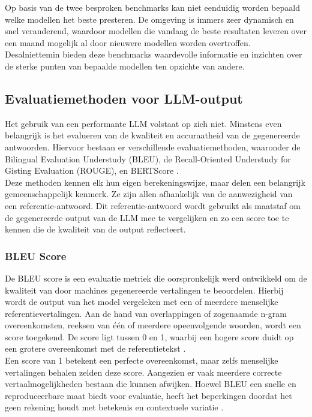 Op basis van de twee besproken benchmarks kan niet eenduidig worden bepaald welke modellen het beste presteren. De omgeving is immers zeer dynamisch en snel veranderend, waardoor modellen die vandaag de beste resultaten leveren over een maand mogelijk al door nieuwere modellen worden overtroffen. Desalniettemin bieden deze benchmarks waardevolle informatie en inzichten over de sterke punten van bepaalde modellen ten opzichte van andere.

\subsection{Evaluatiemethoden voor LLM-output}
Het gebruik van een performante LLM volstaat op zich niet. Minstens even belangrijk is het evalueren van de kwaliteit en accuraatheid van de gegenereerde antwoorden. Hiervoor bestaan er verschillende evaluatiemethoden, waaronder de Bilingual Evaluation Understudy (BLEU), de Recall-Oriented Understudy for Gisting Evaluation (ROUGE), en BERTScore \autocite{microsoft2024evaluation}.
\\[1em]
Deze methoden kennen elk hun eigen berekeningswijze, maar delen een belangrijk gemeenschappelijk kenmerk. Ze zijn allen afhankelijk van de aanwezigheid van een referentie-antwoord. Dit referentie-antwoord wordt gebruikt als maatstaf om de gegenereerde output van de LLM mee te vergelijken en zo een score toe te kennen die de kwaliteit van de output reflecteert\autocite{microsoft2024evaluation}.

\subsubsection{BLEU Score}

De BLEU score is een evaluatie metriek die oorspronkelijk werd ontwikkeld om de kwaliteit van door machines gegenereerde vertalingen te beoordelen. Hierbij wordt de output van het model vergeleken met een of meerdere menselijke referentievertalingen. Aan de hand van overlappingen of zogenaamde n-gram overeenkomsten, reeksen van één of meerdere opeenvolgende woorden, wordt een score toegekend. De score ligt tussen 0 en 1, waarbij een hogere score duidt op een grotere overeenkomst met de referentietekst \autocite{papineni-etal-2002-bleu}.
\\[1em]
Een score van 1 betekent een perfecte overeenkomst, maar zelfs menselijke vertalingen behalen zelden deze score. Aangezien er vaak meerdere correcte vertaalmogelijkheden bestaan die kunnen afwijken. Hoewel BLEU een snelle en reproduceerbare maat biedt voor evaluatie, heeft het beperkingen doordat het geen rekening houdt met betekenis en contextuele variatie \autocite{papineni-etal-2002-bleu}.

